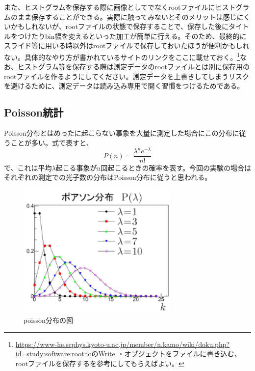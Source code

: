 \documentclass[10pt]{ujarticle}
\begin{document}
また、ヒストグラムを保存する際に画像としてでなくrootファイルにヒストグラムのまま保存することができる。実際に触ってみないとそのメリットは感じにくいかもしれないが、rootファイルの状態で保存することで、保存した後にタイトルをつけたりbin幅を変えるといった加工が簡単に行える。そのため、最終的にスライド等に用いる時以外はrootファイルで保存しておいたほうが便利かもしれない。具体的なやり方が書かれているサイトのリンクをここに載せておく。\footnote{\url{https://www-he.scphys.kyoto-u.ac.jp/member/n.kamo/wiki/doku.php?id=study:software:root:io}のWrite ・オブジェクトをファイルに書き込む、rootファイルを保存するを参考にしてもらえばよい。}なお、ヒストグラム等を保存する際は測定データのrootファイルとは別に保存用のrootファイルを作るようにしてください。測定データを上書きしてしまうリスクを避けるために、測定データは読み込み専用で開く習慣をつけるためである。

\subsection{Poisson統計}
Poisson分布とはめったに起こらない事象を大量に測定した場合にこの分布に従うことが多い。式で表すと、
\begin{equation}
P\left(n\right)=\frac{\lambda^n e^{-\lambda}}{n!}
\end{equation}
で、これは平均$\lambda$起こる事象がn回起こるときの確率を表す。今回の実験の場合はそれぞれの測定での光子数の分布はPoisson分布に従うと思われる。
\begin{figure}[h]
\begin{center}
\includegraphics[width=8cm]{SummerChallenge_poisson.png}
\caption{poisson分布の図}
\label{fig:poisson}
\end{center}
\end{figure}
\end{document}
